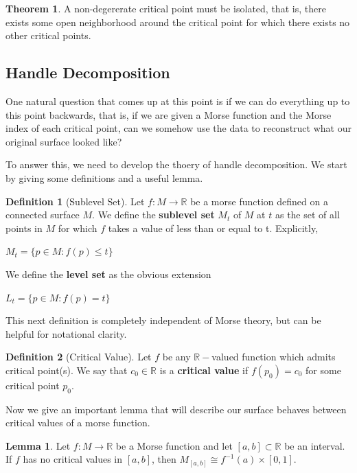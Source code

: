 \documentclass[12pt]{article}
\newcommand{\bR}{{\mathbb R}}
\theoremstyle{definition}
\newtheorem{definition}{Definition}
\newtheorem{theorem}{Theorem}
\newtheorem{lemma}{Lemma}
\begin{document}
\begin{theorem}
	A non-degererate critical point must be isolated, that is, there exists some open neighborhood around the critical point for which there exists no other critical points. 	
\end{theorem}

\subsection{Handle Decomposition}

One natural question that comes up at this point is if we can do everything up to this point backwards, that is, if we are given a Morse function and the Morse index of each critical point, can we somehow use the data to reconstruct what our original surface looked like?

To answer this, we need to develop the thoery of handle decomposition. We start by giving some definitions and a useful lemma. 

\begin{definition}[Sublevel Set]
	Let $f:M\rightarrow \bR$ be a morse function defined on a connected surface $M$. We define the \textbf{sublevel set} $M_t$ of $M$ at $t$ as the set of all points in $M$ for which $f$ takes a value of less than or equal to t. Explicitly, 
	\begin{center}
		$M_t = \{p\in M: f(p)\leq t\}$
	\end{center}
	We define the \textbf{level set} as the obvious extension
	\begin{center}
		$L_t = \{p\in M: f(p)= t\}$
	\end{center}
\end{definition}

\noindent
This next definition is completely independent of Morse theory, but can be helpful for notational clarity. 

\begin{definition}[Critical Value]
	Let $f$ be any $\bR-$valued function which admits critical point(s). We say that $c_0 \in \bR$ is a \textbf{critical value} if $f(p_0) = c_0$ for some critical point $p_0$. 
\end{definition}
\noindent 
Now we give an important lemma that will describe our surface behaves between critical values of a morse function. 
\begin{lemma} Let $f:M\rightarrow \bR$ be a Morse function and let $[a,b]\subset \bR$ be an interval. If $f$ has no critical values in $[a,b]$, then $M_{[a,b]}\cong f^{-1}(a) \times [0,1]$. 
\end{lemma}
\end{document}

